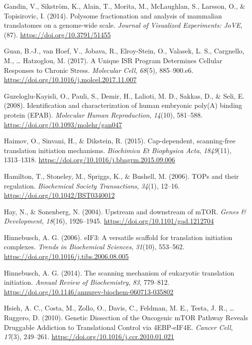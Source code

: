 \documentclass[12pt,openany]{book}
\begin{document}
\hypertarget{ref-Gandin2014}{}
Gandin, V., Sikström, K., Alain, T., Morita, M., McLaughlan, S.,
Larsson, O., \& Topisirovic, I. (2014). Polysome fractionation and
analysis of mammalian translatomes on a genome-wide scale. \emph{Journal
of Visualized Experiments: JoVE}, (87).
\url{https://doi.org/10.3791/51455}

\hypertarget{ref-Guan2017}{}
Guan, B.-J., van Hoef, V., Jobava, R., Elroy-Stein, O., Valasek, L. S.,
Cargnello, M., \ldots{} Hatzoglou, M. (2017). A Unique ISR Program
Determines Cellular Responses to Chronic Stress. \emph{Molecular Cell},
\emph{68}(5), 885--900.e6.
\url{https://doi.org/10.1016/j.molcel.2017.11.007}

\hypertarget{ref-Guzeloglu-Kayisli2008}{}
Guzeloglu-Kayisli, O., Pauli, S., Demir, H., Lalioti, M. D., Sakkas, D.,
\& Seli, E. (2008). Identification and characterization of human
embryonic poly(A) binding protein (EPAB). \emph{Molecular Human
Reproduction}, \emph{14}(10), 581--588.
\url{https://doi.org/10.1093/molehr/gan047}

\hypertarget{ref-Haimov2015}{}
Haimov, O., Sinvani, H., \& Dikstein, R. (2015). Cap-dependent,
scanning-free translation initiation mechanisms. \emph{Biochimica Et
Biophysica Acta}, \emph{1849}(11), 1313--1318.
\url{https://doi.org/10.1016/j.bbagrm.2015.09.006}

\hypertarget{ref-Hamilton2006}{}
Hamilton, T., Stoneley, M., Spriggs, K., \& Bushell, M. (2006). TOPs and
their regulation. \emph{Biochemical Society Transactions}, \emph{34}(1),
12--16. \url{https://doi.org/10.1042/BST0340012}

\hypertarget{ref-Hay2004}{}
Hay, N., \& Sonenberg, N. (2004). Upstream and downstream of mTOR.
\emph{Genes \& Development}, \emph{18}(16), 1926--1945.
\url{https://doi.org/10.1101/gad.1212704}

\hypertarget{ref-Hinnebusch2006}{}
Hinnebusch, A. G. (2006). eIF3: A versatile scaffold for translation
initiation complexes. \emph{Trends in Biochemical Sciences},
\emph{31}(10), 553--562.
\url{https://doi.org/10.1016/j.tibs.2006.08.005}

\hypertarget{ref-Hinnebusch2014}{}
Hinnebusch, A. G. (2014). The scanning mechanism of eukaryotic
translation initiation. \emph{Annual Review of Biochemistry}, \emph{83},
779--812. \url{https://doi.org/10.1146/annurev-biochem-060713-035802}

\hypertarget{ref-Hsieh2010}{}
Hsieh, A. C., Costa, M., Zollo, O., Davis, C., Feldman, M. E., Testa, J.
R., \ldots{} Ruggero, D. (2010). Genetic Dissection of the Oncogenic
mTOR Pathway Reveals Druggable Addiction to Translational Control via
4EBP-eIF4E. \emph{Cancer Cell}, \emph{17}(3), 249--261.
\url{https://doi.org/10.1016/j.ccr.2010.01.021}
\end{document}
